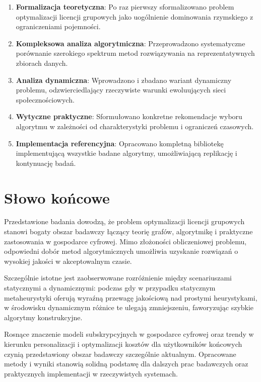 \begin{enumerate}
  \item \textbf{Formalizacja teoretyczna}: Po raz pierwszy sformalizowano problem optymalizacji licencji grupowych jako uogólnienie dominowania rzymskiego z ograniczeniami pojemności.

  \item \textbf{Kompleksowa analiza algorytmiczna}: Przeprowadzono systematyczne porównanie szerokiego spektrum metod rozwiązywania na reprezentatywnych zbiorach danych.

  \item \textbf{Analiza dynamiczna}: Wprowadzono i zbadano wariant dynamiczny problemu, odzwierciedlający rzeczywiste warunki ewoluujących sieci społecznościowych.

  \item \textbf{Wytyczne praktyczne}: Sformułowano konkretne rekomendacje wyboru algorytmu w zależności od charakterystyki problemu i ograniczeń czasowych.

  \item \textbf{Implementacja referencyjna}: Opracowano kompletną bibliotekę implementującą wszystkie badane algorytmy, umożliwiającą replikację i kontynuację badań.
\end{enumerate}

\section{Słowo końcowe}

Przedstawione badania dowodzą, że problem optymalizacji licencji grupowych stanowi bogaty obszar badawczy łączący teorię grafów, algorytmikę i praktyczne zastosowania w gospodarce cyfrowej. Mimo złożoności obliczeniowej problemu, odpowiedni dobór metod algorytmicznych umożliwia uzyskanie rozwiązań o wysokiej jakości w akceptowalnym czasie.

Szczególnie istotne jest zaobserwowane rozróżnienie między scenariuszami statycznymi a dynamicznymi: podczas gdy w przypadku statycznym metaheurystyki oferują wyraźną przewagę jakościową nad prostymi heurystykami, w środowisku dynamicznym różnice te ulegają zmniejszeniu, faworyzując szybkie algorytmy konstrukcyjne.

Rosnące znaczenie modeli subskrypcyjnych w gospodarce cyfrowej oraz trendy w kierunku personalizacji i optymalizacji kosztów dla użytkowników końcowych czynią przedstawiony obszar badawczy szczególnie aktualnym. Opracowane metody i wyniki stanowią solidną podstawę dla dalszych prac badawczych oraz praktycznych implementacji w rzeczywistych systemach.
